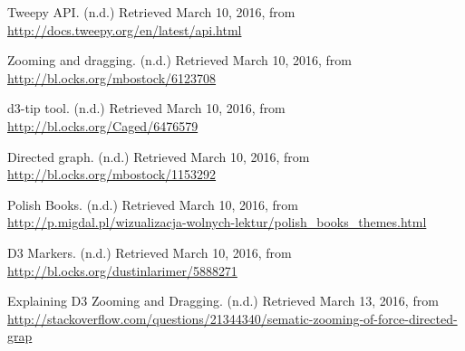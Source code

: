 \documentclass{article}
\begin{document}
\newpage
\begin{thebibliography}{9}
%
Tweepy API. (n.d.) Retrieved March 10, 2016, from \url{http://docs.tweepy.org/en/latest/api.html}

Zooming and dragging. (n.d.) Retrieved March 10, 2016, from \url{http://bl.ocks.org/mbostock/6123708}

d3-tip tool. (n.d.) Retrieved March 10, 2016, from \url{ http://bl.ocks.org/Caged/6476579}

Directed graph. (n.d.) Retrieved March 10, 2016, from \url{http://bl.ocks.org/mbostock/1153292}

Polish Books. (n.d.) Retrieved March 10, 2016, from \url{http://p.migdal.pl/wizualizacja-wolnych-lektur/polish_books_themes.html}

D3 Markers. (n.d.) Retrieved March 10, 2016, from \url{http://bl.ocks.org/dustinlarimer/5888271}

Explaining D3 Zooming and Dragging. (n.d.) Retrieved March 13, 2016, from \url{http://stackoverflow.com/questions/21344340/sematic-zooming-of-force-directed-grap}
\end{thebibliography}
\end{document}
